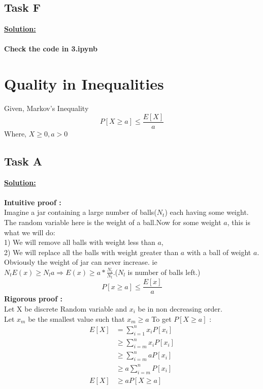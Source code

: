 \documentclass[12pt]{article}
\begin{document}
\subsection{Task F}
\textbf{\underline{Solution:}}\\
\\
\textbf{Check the code in 3.ipynb}
\section{Quality in Inequalities}
Given, Markov's Inequality
\begin{equation}
    P[X \geq a] \leq \frac{E[X]}{a}
\end{equation}
Where, 
    $X \geq 0, a>0$
\subsection{Task A}
\textbf{\underline{Solution:}}\\
\\
\textbf{Intuitive proof :}\\
Imagine a jar containing a large number of balls($N_t$) each having some weight. The random variable here is the weight of a ball.Now for some weight $a$, this is what we will do: \\1) We will remove all balls with weight less than $a$, \\2) We will replace all the balls with weight greater than $a$ with a ball of weight $a$.\\Obviously the weight of jar can never increase. ie $N_{t}E(x) \ge N_{l}a \Rightarrow E(x)\ge a*\frac{N_{l}}{N_{t}} $.($N_l$ is number of balls left.)\\
\[P[x \ge a] \le \frac{E[x]}{a}\]
\textbf{Rigorous proof :}\\
Let X be discrete Random variable and $x_{i}$ be in non decreasing order. \\
Let $x_m$ be the smallest value such that $x_m \ge a$  
To get $P[X\geq a]$ :
\begin{equation}
\begin{split}
    E[X]& = \sum_{i=1}^{n}x_iP[x_i] \\
    & \geq \sum_{i=m}^{n}x_iP[x_i] \\
    & \geq \sum_{i=m}^{n}aP[x_i] \\
    & \geq a\sum_{i=m}^{n}P[x_i] \\
    E[X]& \geq aP[X\geq a]
\end{split}
\end{equation}
\end{document}
